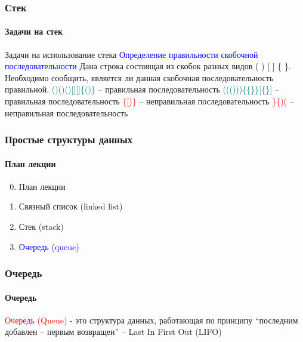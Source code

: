 \documentclass[aspectratio=169]{beamer}
\begin{document}
\begin{frame}
\frametitle{Стек}
\framesubtitle{Задачи на стек}
\justifying
Задачи на использование стека\newline\newline
\textcolor{blue}{Определение правильности скобочной последовательности}\newline
Дана строка состоящая из скобок разных видов ( ) [ ] \{ \}. Необходимо сообщить, является ли данная скобочная последовательность правильной.\newline\newline
\textcolor{teal}{()()()[][]\{()\}} – правильная последовательность\newline\newline
\textcolor{teal}{((()))\{\{\}\}[\{\}]} – правильная последовательность\newline\newline
\textcolor{red}{\{[)\}} – неправильная последовательность\newline\newline
\textcolor{red}{\}\{)(} – неправильная последовательность\newline\newline

\end{frame}

\begin{frame}
\frametitle{Простые структуры данных}
\framesubtitle{План лекции}

\begin{enumerate}
  \setcounter{enumi}{-1}
  \item{План лекции}
  \item{Связный список (linked list)}
  \item{Стек (stack)}
  \item{\textcolor{blue}{Очередь (queue)}}
\end{enumerate}
\end{frame}

\begin{frame}
\frametitle{Очередь}
\framesubtitle{Очередь}
\justifying
\textcolor{red}{Очередь (Queue)} - это структура данных, работающая по принципу “последним добавлен – первым возвращен” – Last In First Out (LIFO)

\begin{figure}
    \captionsetup[subfigure]{labelformat=empty}
    \centering
\end{figure}
\end{frame}
\end{document}
